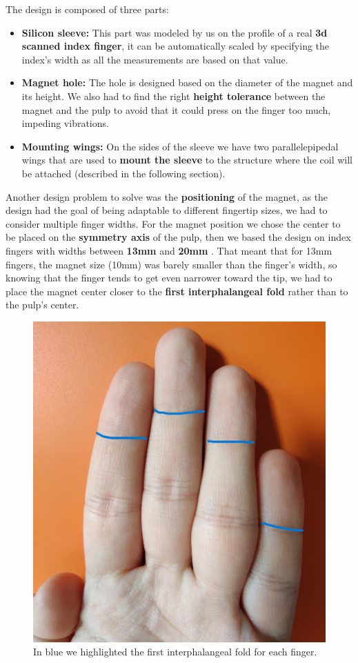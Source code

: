 \begin{samepage}
    The design is composed of three parts:
    \nopagebreak

    \begin{itemize}
        \item \textbf{Silicon sleeve: } This part was modeled by us on the profile of a real \textbf{3d scanned index finger}, it can be automatically scaled by specifying the index's width as all the measurements are based on that value.
        \item \textbf{Magnet hole: } The hole is designed based on the diameter of the magnet and its height. We also had to find the right \textbf{height tolerance} between the magnet and the pulp to avoid that it could press on the finger too much, impeding vibrations.
        \item \textbf{Mounting wings: } On the sides of the sleeve we have two parallelepipedal wings that are used to \textbf{mount the sleeve} to the structure where the coil will be attached (described in the following section). 
    \end{itemize}
\end{samepage}

Another design problem to solve was the \textbf{positioning} of the magnet, as the design had the goal of being adaptable to different fingertip sizes, we had to consider multiple finger widths. 
For the magnet position we chose the center to be placed on the \textbf{symmetry axis} of the pulp, then we based the design on index fingers with widths between \textbf{13mm} and \textbf{20mm} \cite{index_fingers_width}.
That meant that for 13mm fingers, the magnet size (10mm) was barely smaller than the finger's width, so knowing that the finger tends to get even narrower toward the tip, we had to place the magnet center closer to the \textbf{first interphalangeal fold} rather than to the pulp's center.

\begin{figure}[H]
    \centering
    \includegraphics[width=0.4\linewidth]{Chapters/Chapter5/Rigid_Prototypes/Figures/fingers.jpg}
    \caption{In blue we highlighted the first interphalangeal fold for each finger.}
    \label{fig: fingers}
\end{figure}


